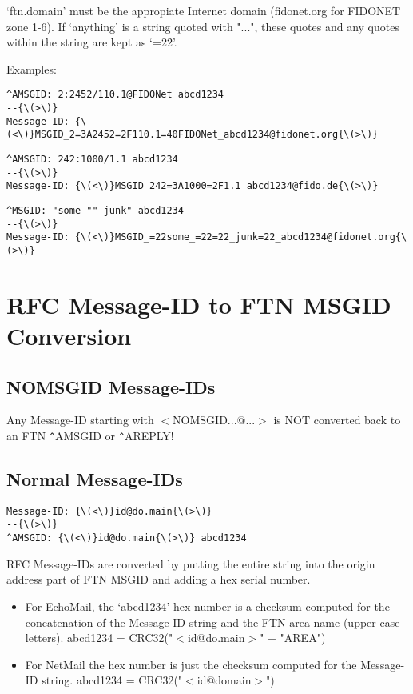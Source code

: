 \documentclass{article}
\begin{document}
`ftn.domain' must be the appropiate Internet domain (fidonet.org for FIDONET zone 1-6). If `anything' is a string quoted with "...", these quotes and any quotes within the string are kept as `=22'.

Examples:  
\begin{verbatim}
^AMSGID: 2:2452/110.1@FIDONet abcd1234 
--{\(>\)} 
Message-ID: {\(<\)}MSGID_2=3A2452=2F110.1=40FIDONet_abcd1234@fidonet.org{\(>\)}
\end{verbatim}




\begin{verbatim}
^AMSGID: 242:1000/1.1 abcd1234 
--{\(>\)} 
Message-ID: {\(<\)}MSGID_242=3A1000=2F1.1_abcd1234@fido.de{\(>\)}
\end{verbatim}




\begin{verbatim}
^MSGID: "some "" junk" abcd1234 
--{\(>\)} 
Message-ID: {\(<\)}MSGID_=22some_=22=22_junk=22_abcd1234@fidonet.org{\(>\)}
\end{verbatim}



\section{RFC Message-ID to FTN MSGID Conversion}




\subsection{NOMSGID Message-IDs }



Any Message-ID starting with {\(<\)}NOMSGID...@...{\(>\)} is NOT converted back to an FTN \verb+^+AMSGID or \verb+^+AREPLY! 


\subsection{Normal Message-IDs }

\begin{verbatim}
Message-ID: {\(<\)}id@do.main{\(>\)} 
--{\(>\)} 
^AMSGID: {\(<\)}id@do.main{\(>\)} abcd1234 
\end{verbatim}


RFC Message-IDs are converted by putting the entire string into the origin address part of FTN MSGID and adding a hex serial number.
\begin{itemize}
\item For EchoMail, the `abcd1234' hex number is a checksum computed for the concatenation of the Message-ID string and the FTN area name (upper case letters).
abcd1234 = CRC32("{\(<\)}id@do.main{\(>\)}" + "AREA")
\item For NetMail the hex number is just the checksum computed for the Message-ID string. 
abcd1234 = CRC32("{\(<\)}id@domain{\(>\)}")
\end{itemize}
\end{document}
